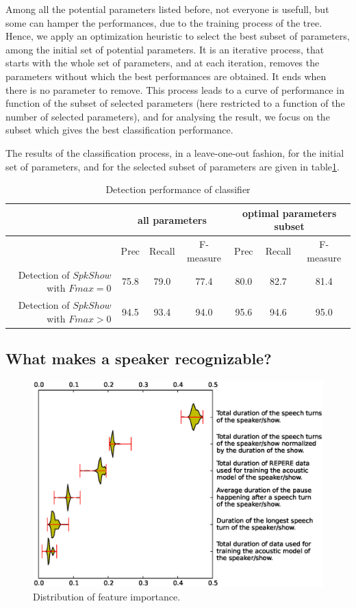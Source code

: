 Among all the potential parameters listed before, not everyone is usefull, but some can hamper the performances, due to the training process of the tree. Hence, we apply an optimization heuristic to select the best subset of parameters, among the initial set of potential parameters. It is an iterative process, that starts with the whole set of parameters, and at each iteration, removes the parameters without which the best performances are obtained. It ends when there is no parameter to remove. This process leads to a curve of performance in function of the subset of selected parameters (here restricted to a function of the number of selected parameters), and for analysing the result, we focus on the subset which gives the best classification performance.

 The results of the classification process, in a leave-one-out fashion, for the initial set of parameters, and for the selected subset of parameters are given in table\ref{tableresult}.
\begin{table}[t]
\begin{center}
\begin{tabular}{r||c|c|c||c|c|c|}
& \multicolumn{3}{c}{all parameters}& \multicolumn{3}{c}{optimal parameters subset}\\\hline
& Prec & Recall & F-measure & Prec & Recall & F-measure \\\hline
Detection of $SpkShow$ with $Fmax=0$ & 75.8 & 79.0 & 77.4 & 80.0 & 82.7 & 81.4 \\\hline
Detection of $SpkShow$ with $Fmax>0$ & 94.5 & 93.4 & 94.0 & 95.6 & 94.6 & 95.0 \\\hline
\end{tabular}
\caption{Detection performance of classifier}
\label{tableresult}
\end{center}
\end{table}

\subsection{What makes a speaker recognizable?}

\begin{figure}[t]
\centering
\includegraphics[width=\linewidth]{figures/violin.eps}
\caption{Distribution of feature importance.}
\label{fig:featureImportance}
\end{figure}


